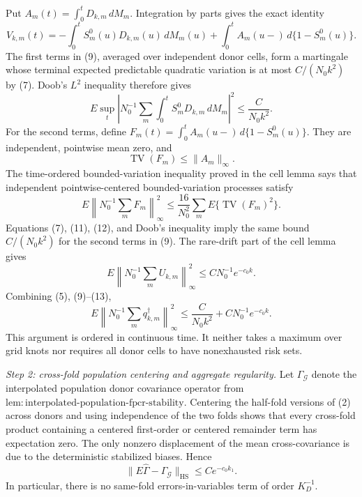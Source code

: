 Put \(A_m(t)=\int_0^tD_{k,m}\,dM_m\).  Integration by parts gives the exact identity
\[
 V_{k,m}(t)
 =-\int_0^tS_m^0(u)D_{k,m}(u)\,dM_m(u)
 +\int_0^tA_m(u-)\,d\{1-S_m^0(u)\}.
\tag{9}
\]
The first terms in (9), averaged over independent donor cells, form a martingale whose terminal expected predictable quadratic variation is at most \(C/(N_0k^2)\) by (7).  Doob's \(L^2\) inequality therefore gives
\[
 E\sup_t\left|N_0^{-1}\sum_m
 \int_0^tS_m^0D_{k,m}\,dM_m\right|^2
 \le \frac{C}{N_0k^2}.
\tag{10}
\]
For the second terms, define
\(F_m(t)=\int_0^tA_m(u-)\,d\{1-S_m^0(u)\}\).  They are independent, pointwise mean zero, and
\[
 \operatorname{TV}(F_m)\le\|A_m\|_\infty.
\tag{11}
\]
The time-ordered bounded-variation inequality proved in the cell lemma says that independent pointwise-centered bounded-variation processes satisfy
\[
 E\left\|N_0^{-1}\sum_mF_m\right\|_\infty^2
 \le\frac{16}{N_0^2}\sum_mE\{\operatorname{TV}(F_m)^2\}.
\tag{12}
\]
Equations (7), (11), (12), and Doob's inequality imply the same bound \(C/(N_0k^2)\) for the second terms in (9).  The rare-drift part of the cell lemma gives
\[
 E\left\|N_0^{-1}\sum_mU_{k,m}\right\|_\infty^2
 \le CN_0^{-1}e^{-c_0k}.
\tag{13}
\]
Combining (5), (9)--(13),
\[
 E\left\|N_0^{-1}\sum_mq_{k,m}^\dagger\right\|_\infty^2
 \le \frac{C}{N_0k^2}+CN_0^{-1}e^{-c_0k}.
\tag{14}
\]
This argument is ordered in continuous time.  It neither takes a maximum over grid knots nor requires all donor cells to have nonexhausted risk sets.

\emph{Step 2: cross-fold population centering and aggregate regularity.}
Let \(\Gamma_{\mathcal G}\) denote the interpolated population donor covariance operator from
\(\mathrm{lem:interpolated\mbox{-}population\mbox{-}fpcr\mbox{-}stability}\).  Centering the half-fold versions of (2) across donors and using independence of the two folds shows that every cross-fold product containing a centered first-order or centered remainder term has expectation zero.  The only nonzero displacement of the mean cross-covariance is due to the deterministic stabilized biases.  Hence
\[
 \|E\widehat\Gamma-\Gamma_{\mathcal G}\|_{\mathrm{HS}}
 \le Ce^{-c_0k_1}.
\tag{15}
\]
In particular, there is no same-fold errors-in-variables term of order \(K_D^{-1}\).

